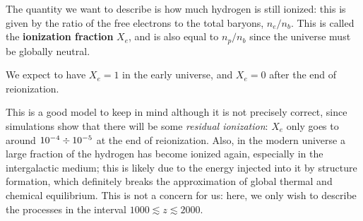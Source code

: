 \documentclass[main.tex]{subfiles}
\begin{document}
The quantity we want to describe is how much hydrogen is still ionized: this is given by the ratio of the free electrons to the total baryons, \(n_e / n_b\). This is called the \textbf{ionization fraction} \(X_e\), and is also equal to \(n_p / n_b\) since the universe must be globally neutral. 

We expect to have \(X_e = 1\) in the early universe, and \(X_e = 0\) after the end of reionization.

This is a good model to keep in mind although it is not precisely correct, since simulations show that there will be some \emph{residual ionization}: \(X_e\) only goes to around \(\num{e-4} \divisionsymbol \num{e-5}\) at the end of reionization.
Also, in the modern universe a large fraction of the hydrogen has become ionized again, especially in the intergalactic medium; this is likely due to the energy injected into it by structure formation, which definitely breaks the approximation of global thermal and chemical equilibrium. 
This is not a concern for us: here, we only wish to describe the processes in the interval \(1000 \lesssim z \lesssim 2000\). 
 



\end{document}
